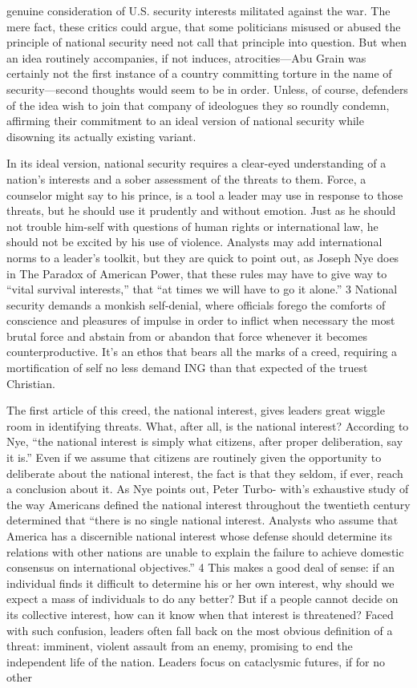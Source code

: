 genuine consideration of U.S. security interests militated against the war. The mere fact, these critics could argue, that some politicians misused or abused the principle of national security need not call that principle into question. But when an idea routinely accompanies, if not induces, atrocities—Abu Grain was certainly not the first instance of a country committing torture in the name of security—second thoughts would seem to be in order. Unless, of course, defenders of the idea wish to join that company of ideologues they so roundly condemn, affirming their commitment to an ideal version of national security while disowning its actually existing variant.{\par} In its ideal version, national security requires a clear-eyed understanding of a nation’s interests and a sober assessment of the threats to them. Force, a counselor might say to his prince, is a tool a leader may use in response to those threats, but he should use it prudently and without emotion. Just as he should not trouble him-self with questions of human rights or international law, he should not be excited by his use of violence. Analysts may add international norms to a leader’s toolkit, but they are quick to point out, as Joseph Nye does in The Paradox of American Power, that these rules may have to give way to “vital survival interests,” that “at times we will have to go it alone.” {\color{blue} 3 } National security demands a monkish self-denial, where officials forego the comforts of conscience and pleasures of impulse in order to inflict when necessary the most brutal force and abstain from or abandon that force whenever it becomes counterproductive. It’s an ethos that bears all the marks of a creed, requiring a mortification of self no less demand ING than that expected of the truest Christian.{\par} The first article of this creed, the national interest, gives leaders great wiggle room in identifying threats. What, after all, is the national interest? According to Nye, “the national interest is simply what citizens, after proper deliberation, say it is.” Even if we assume that citizens are routinely given the opportunity to deliberate about the national interest, the fact is that they seldom, if ever, reach a conclusion about it. As Nye points out, Peter Turbo- with’s exhaustive study of the way Americans defined the national interest throughout the twentieth century determined that “there is no single national interest. Analysts who assume that America has a discernible national interest whose defense should determine its relations with other nations are unable to explain the failure to achieve domestic consensus on international objectives.” {\color{blue} 4 } This makes a good deal of sense: if an individual finds it difficult to determine his or her own interest, why should we expect a mass of individuals to do any better? But if a people cannot decide on its collective interest, how can it know when that interest is threatened? Faced with such confusion, leaders often fall back on the most obvious definition of a threat: imminent, violent assault from an enemy, promising to end the independent life of the nation. Leaders focus on cataclysmic futures, if for no other 